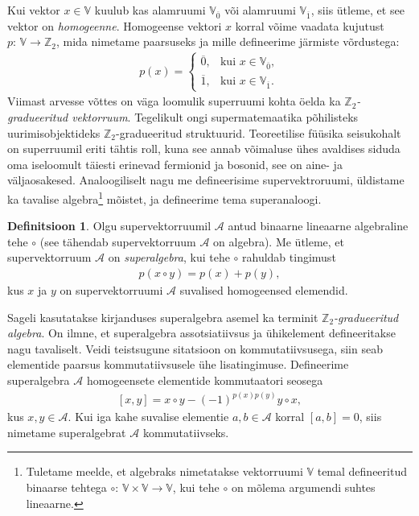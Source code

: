 \documentclass[12pt,a4paper,oneside]{article}
\theoremstyle{plain}
\theoremstyle{definition}
\newtheorem{definitsioon}{Definitsioon}[section]
\numberwithin{equation}{section}
\def\V{{\mathbb V}}
\def\Z{{\mathbb Z}}
\def\A{{\mathcal A}}
\begin{document}
Kui vektor $x \in \V$ kuulub kas alamruumi $\V_{\overline{0}}$ või 
alamruumi $\V_{\overline{1}}$, siis ütleme, et see vektor on 
\emph{homogeenne}. Homogeense vektori $x$ korral võime vaadata 
kujutust $p \colon\, \V \rightarrow \Z_2$, mida nimetame paarsuseks ja mille 
defineerime järmiste võrdustega:
\begin{align*}
p\left(x\right) = \begin{cases}
    \overline{0},& \text{kui $x \in \V_{\overline{0}}$},\\
    \overline{1},& \text{kui $x \in \V_{\overline{1}}$}.
  \end{cases}
\end{align*}
Viimast arvesse võttes on väga loomulik superruumi kohta öelda ka 
\emph{$\Z_2$-graduee\-ritud vektorruum}. Tegelikult ongi 
supermatemaatika põhilisteks uurimisobjektideks $\Z_2$-gradueeritud 
struktuurid. Teoreetilise füüsika seisukohalt on superruumil 
eriti tähtis roll, kuna see annab võimaluse ühes avaldises 
siduda oma iseloomult täiesti erinevad fermionid ja bosonid, 
see on aine- ja väljaosakesed. Analoogiliselt nagu me defineerisime 
supervektroruumi, üldistame ka tavalise algebra\footnote{
Tuletame meelde, et algebraks nimetatakse 
vektorruumi $\V$ temal defineeritud binaarse tehtega 
$\circ \colon\, \V \times \V \rightarrow \V$, kui tehe $\circ$ on mõlema 
argumendi suhtes lineaarne.} mõistet, ja defineerime 
tema superanaloogi.

\begin{definitsioon}
Olgu supervektorruumil $\A$ antud binaarne lineaarne algebraline 
tehe $\circ$ (see tähendab supervektorruum $\A$ on algebra). Me 
ütleme, et supervektorruum $\A$ on \emph{superalgebra}, kui tehe 
$\circ$ rahuldab tingimust
\begin{align*}
p\left(x \circ y\right) = p\left(x\right) + p\left(y\right),
\end{align*}
kus $x$ ja $y$ on supervektorruumi $\A$ suvalised homogeensed 
elemendid.
\end{definitsioon}

Sageli kasutatakse kirjanduses superalgebra asemel ka terminit 
\emph{$\Z_2$-gradueeritud algebra}. On ilmne, et superalgebra
assotsiatiivsus ja ühikelement defineeritakse nagu tavaliselt. 
Veidi teistsugune sitatsioon on kommutatiivsusega, siin seab 
elementide paarsus kommutatiivsusele ühe lisatingimuse. Defineerime 
superalgebra $\A$ homogeensete elementide kommutaatori seosega
\begin{align*}
\left[x, y\right] = x \circ y - 
\left(-1\right)^{p\left(x\right) p\left(y\right)} y \circ x,
\end{align*}
kus $x, y \in \A$. Kui iga kahe suvalise elementie $a, b \in \A$ 
korral $\left[a, b\right] = 0$, siis nimetame superalgebrat $\A$ 
kommutatiivseks.
\end{document}
